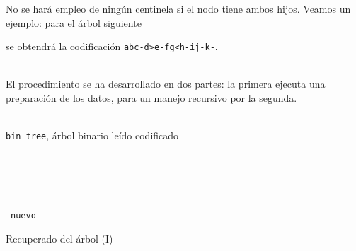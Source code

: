 \documentclass[a4paper,10pt]{scrartcl}
\begin{document}
 No se hará empleo de ningún centinela si el nodo tiene ambos hijos. Veamos un ejemplo: para el árbol siguiente
 
 
 se obtendrá la codificación \texttt{abc-d>e-fg<h-ij-k-}.\\\
 
 El procedimiento se ha desarrollado en dos partes: la primera ejecuta una
 preparación de los datos, para un manejo recursivo por la segunda.
  
   
      \begin{algorithm}[H]
      \begin{algorithmic}[1]
     \REQUIRE \ \\
         \texttt{bin\_tree}, árbol binario leído codificado\\\
     
     \\\
       \ELSE
         \ENDIF
       \ENDIF
     \ENDFOR
     \\\
     \\\
     \RETURN \texttt{nuevo}
      \end{algorithmic}
      \caption{Recuperado del árbol (I)}
      \label{rec1}
      \end{algorithm}
   
\end{document}
